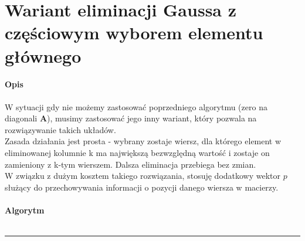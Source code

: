 \documentclass{article}
\newcommand{\mA}{\bm{A}}
\begin{document}
\section*{Wariant eliminacji Gaussa z częściowym wyborem elementu głównego}
\noindent \textbf{Opis}\\\\
W sytuacji gdy nie możemy zastosować poprzedniego algorytmu (zero na diagonali $\mA$), musimy zastosować jego inny wariant, który pozwala na rozwiązywanie takich układów.\\
\indent Zasada działania jest prosta - wybrany zostaje wiersz, dla którego element w eliminowanej kolumnie k ma największą bezwzględną wartość i zostaje on zamieniony z k-tym wierszem. Dalsza eliminacja przebiega bez zmian.\\
\indent W związku z dużym kosztem takiego rozwiązania, stosuję dodatkowy wektor $p$ służący do przechowywania informacji o pozycji danego wiersza w macierzy.\\\\
\noindent \textbf{Algorytm}\\\\
\rule{\textwidth}{0.4pt}
\end{document}
